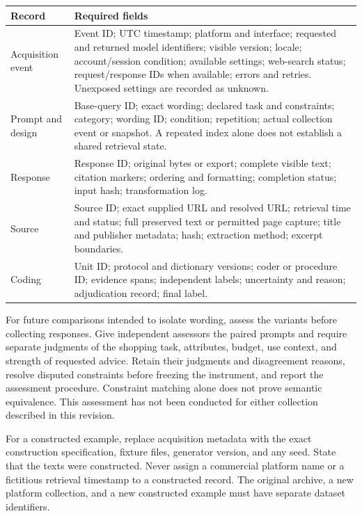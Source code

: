 \documentclass[10pt,a4paper]{article}
\begin{document}
\begin{tabularx}{\textwidth}{L{3.5cm}Y}
\toprule Record & Required fields \\
\midrule
Acquisition event & Event ID; UTC timestamp; platform and interface; requested and returned model identifiers; visible version; locale; account/session condition; available settings; web-search status; request/response IDs when available; errors and retries. Unexposed settings are recorded as unknown. \\
Prompt and design & Base-query ID; exact wording; declared task and constraints; category; wording ID; condition; repetition; actual collection event or snapshot. A repeated index alone does not establish a shared retrieval state. \\
Response & Response ID; original bytes or export; complete visible text; citation markers; ordering and formatting; completion status; input hash; transformation log. \\
Source & Source ID; exact supplied URL and resolved URL; retrieval time and status; full preserved text or permitted page capture; title and publisher metadata; hash; extraction method; excerpt boundaries. \\
Coding & Unit ID; protocol and dictionary versions; coder or procedure ID; evidence spans; independent labels; uncertainty and reason; adjudication record; final label. \\
\bottomrule
\end{tabularx}

For future comparisons intended to isolate wording, assess the variants before collecting responses. Give independent assessors the paired prompts and require separate judgments of the shopping task, attributes, budget, use context, and strength of requested advice. Retain their judgments and disagreement reasons, resolve disputed constraints before freezing the instrument, and report the assessment procedure. Constraint matching alone does not prove semantic equivalence. This assessment has not been conducted for either collection described in this revision.

For a constructed example, replace acquisition metadata with the exact construction specification, fixture files, generator version, and any seed. State that the texts were constructed. Never assign a commercial platform name or a fictitious retrieval timestamp to a constructed record. The original archive, a new platform collection, and a new constructed example must have separate dataset identifiers.
\end{document}
